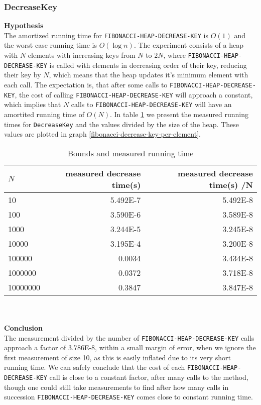 \documentclass[a4paper,10pt]{article}
\begin{document}
\subsubsection{DecreaseKey}
{\bf Hypothesis}\\
The amortized running time for \texttt{FIBONACCI-HEAP-DECREASE-KEY} is $O(1)$ and the worst case running time is $O(\log n)$. The experiment consists of a heap with $N$ elements with increasing keys from $N$ to $2N$, where \texttt{FIBONACCI-HEAP-DECREASE-KEY} is called with elements in decreasing order of their key, reducing their key by $N$, which means that the heap updates it's minimum element with each call. The expectation is, that after some calls to \texttt{FIBONACCI-HEAP-DECREASE-KEY}, the cost of calling \texttt{FIBONACCI-HEAP-DECREASE-KEY} will approach a constant, which implies that $N$ calls to \texttt{FIBONACCI-HEAP-DECREASE-KEY} will have an amortited running time of $O(N)$. In table \ref{fibonacci-decrease-key-table} we present the measured running times for \texttt{DecreaseKey} and the values divided by the size of the heap. These values are plotted in graph \ref{fibonacci-decrease-key-per-element}.
\begin{table}
  \begin{center}
    \begin{tabular}{l|r|r}
      $N$ & measured decrease time(s) & measured decrease time(s) /N \\
      \hline
      10       & \num{5.492E-7}     & \num{5.492E-8}\\
      100      & \num{3.590E-6}     & \num{3.589E-8}\\
      1000     & \num{3.244E-5}     & \num{3.245E-8}\\
      10000    & \num{3.195E-4}     & \num{3.200E-8}\\
      100000   & \num{0.0034}       & \num{3.434E-8}\\
      1000000  & \num{0.0372}       & \num{3.718E-8}\\
      10000000 & \num{0.3847}       & \num{3.847E-8}
    \end{tabular}
    \caption{Bounds and measured running time}
    \label{fibonacci-decrease-key-table}
  \end{center}
\end{table}\\\\
{\bf Conclusion}\\
The measurement divided by the number of \texttt{FIBONACCI-HEAP-DECREASE-KEY} calls approach a factor of \num{3.786E-8}, within a small margin of error, when we ignore the first measurement of size 10, as this is easily inflated due to its very short running time. We can safely conclude that the cost of each \texttt{FIBONACCI-HEAP-DECREASE-KEY} call is close to a constant factor, after many calls to the method, though one could still take measurements to find after how many calls in succession \texttt{FIBONACCI-HEAP-DECREASE-KEY} comes close to constant running time.
\end{document}
